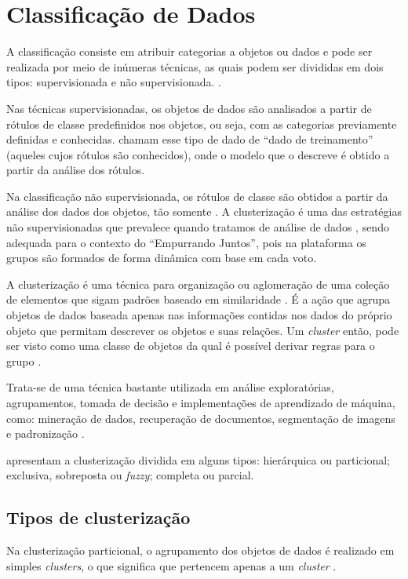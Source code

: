 \chapter{Classificação de Dados} \label{cap:classificação}

A classificação consiste em atribuir categorias a objetos ou dados e pode ser realizada por meio de inúmeras técnicas, as quais podem
ser divididas em dois tipos: supervisionada e não supervisionada. \cite{tan2013data, han2011data, clustering_review}.

Nas técnicas supervisionadas, os objetos de dados são analisados a partir de rótulos de classe predefinidos nos objetos, ou seja, 
com as categorias previamente definidas e conhecidas.  chamam esse tipo de dado de ``dado de treinamento''
(aqueles cujos rótulos são conhecidos), onde o modelo que o descreve é obtido a partir da análise dos rótulos.

Na classificação não supervisionada, os rótulos de classe são obtidos a partir da análise dos dados dos objetos, tão somente \cite{tan2013data}.
A clusterização é uma das estratégias não supervisionadas que prevalece quando tratamos de análise de dados \cite{singh2017proportional}, sendo adequada para o contexto
do ``Empurrando Juntos'', pois na plataforma os grupos são formados de forma dinâmica com base em cada voto.

A clusterização é uma técnica para organização ou aglomeração
de uma coleção de elementos que sigam padrões baseado em similaridade \cite{clustering_review}.
É a ação que agrupa objetos de dados
baseada apenas nas informações contidas nos dados do próprio objeto que permitam descrever os objetos e suas relações. Um \textit{cluster}
então, pode ser visto como uma classe de objetos da qual é possível derivar regras para o grupo \cite{tan2013data, han2011data}.

Trata-se de uma técnica bastante utilizada em análise exploratórias, agrupamentos, 
tomada de decisão e implementações de aprendizado de máquina, como:
mineração de dados, recuperação de documentos, segmentação de imagens e padronização \cite{clustering_review}.

 apresentam a clusterização dividida em alguns tipos: 
hierárquica ou particional; exclusiva, sobreposta ou \textit{fuzzy}; completa ou parcial.

\section{Tipos de clusterização}
Na clusterização particional, o agrupamento dos 
objetos de dados é realizado em simples \textit{clusters}, o que significa que pertencem apenas a um \textit{cluster} \cite{tan2013data}.

